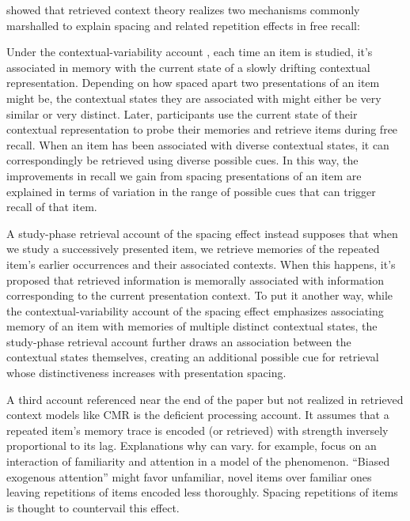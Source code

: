 \citet{siegel2014retrieved} showed that retrieved context theory realizes two mechanisms commonly marshalled to explain spacing and related repetition effects in free recall:

Under the contextual-variability account \citep{anderson1972recognition}, each time an item is studied, it’s associated in memory with the current state of a slowly drifting contextual representation. Depending on how spaced apart two presentations of an item might be, the contextual states they are associated with might either be very similar or very distinct. Later, participants use the current state of their contextual representation to probe their memories and retrieve items during free recall. When an item has been associated with diverse contextual states, it can correspondingly be retrieved using diverse possible cues. In this way, the improvements in recall we gain from spacing presentations of an item are explained in terms of variation in the range of possible cues that can trigger recall of that item. 

A study-phase retrieval account of the spacing effect instead supposes that when we study a successively presented item, we retrieve memories of the repeated item’s earlier occurrences and their associated contexts. When this happens, it’s proposed that retrieved information is memorally associated with information corresponding to the current presentation context. To put it another way, while the contextual-variability account of the spacing effect emphasizes associating memory of an item with memories of multiple distinct contextual states, the study-phase retrieval account further draws an association between the contextual states themselves, creating an additional possible cue for retrieval whose distinctiveness increases with presentation spacing.

A third account referenced near the end of the \citet{siegel2014retrieved} paper but not realized in retrieved context models like CMR is the deficient processing account. It assumes that a repeated item’s memory trace is encoded (or retrieved) with strength inversely proportional to its lag. Explanations why can vary. \citet{collins2020minerva} for example, focus on an interaction of familiarity and attention in a model of the phenomenon. “Biased exogenous attention” might favor unfamiliar, novel items over familiar ones leaving repetitions of items encoded less thoroughly. Spacing repetitions of items is thought to countervail this effect.

